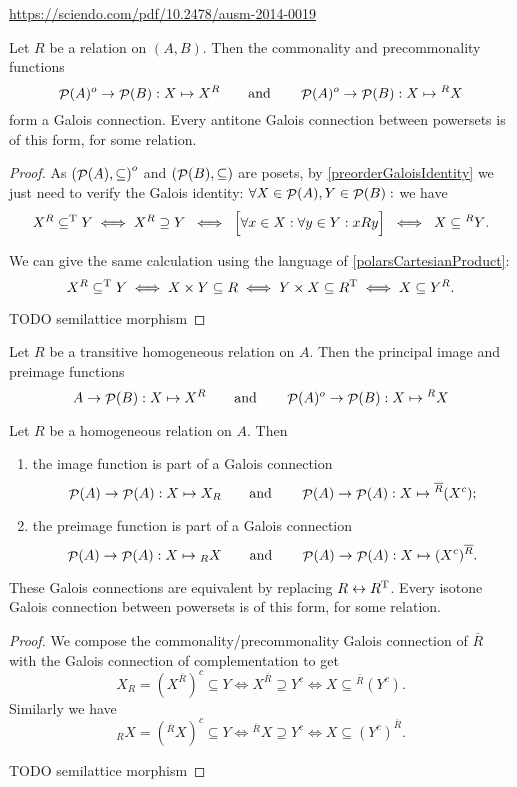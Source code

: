 \url{https://sciendo.com/pdf/10.2478/ausm-2014-0019}

\begin{proposition} \label{polarsGaloisConnection}
Let $R$ be a relation on $(A,B)$. Then the commonality and precommonality functions
\[ \mathop{\mathcal{P}}(A)^o\to\mathop{\mathcal{P}}(B): X\mapsto X^R \qquad\text{and}\qquad \mathop{\mathcal{P}}(A)^o\to\mathop{\mathcal{P}}(B): X\mapsto {^RX} \]
form a Galois connection. Every antitone Galois connection between powersets is of this form, for some relation.
\end{proposition}
\begin{proof}
As $\left( \mathop{\mathcal{P}}(A), \subseteq \right)^o$ and $\left( \mathop{\mathcal{P}}(B), \subseteq \right)$ are posets, by \ref{preorderGaloisIdentity} we just need to verify the Galois identity: $\forall X\in \mathop{\mathcal{P}}(A), Y\in\mathop{\mathcal{P}}(B):$ we have
\[ X^R \subseteq^{\mathrm{T}} Y \iff X^R \supseteq Y \;\iff\; \Big[ \forall x\in X: \forall y\in Y: xRy \Big] \;\iff\; X \subseteq {^RY}. \]

We can give the same calculation using the language of \ref{polarsCartesianProduct}:
\[ X^R \subseteq^{\mathrm{T}} Y \iff X\times Y \subseteq R \iff Y\times X \subseteq R^{\mathrm{T}} \iff X \subseteq Y^R. \]

TODO semilattice morphism
\end{proof}
\begin{corollary}
Let $R$ be a transitive homogeneous relation on $A$. Then the principal image and preimage functions
\[ A \to\mathop{\mathcal{P}}(B): X\mapsto X^R \qquad\text{and}\qquad \mathop{\mathcal{P}}(A)^o\to\mathop{\mathcal{P}}(B): X\mapsto {^RX} \]
\end{corollary}

\begin{proposition} \label{imagePreimageGaloisConnection}
Let $R$ be a homogeneous relation on $A$. Then
\begin{enumerate}
\item the image function is part of a Galois connection
\[ \mathop{\mathcal{P}}(A)\to\mathop{\mathcal{P}}(A): X\mapsto X_R \qquad\text{and}\qquad \mathop{\mathcal{P}}(A)\to\mathop{\mathcal{P}}(A): X\mapsto {^{\overline{R}}(X^c)}; \]
\item the preimage function is part of a Galois connection
\[ \mathop{\mathcal{P}}(A)\to\mathop{\mathcal{P}}(A): X\mapsto {_RX} \qquad\text{and}\qquad \mathop{\mathcal{P}}(A)\to\mathop{\mathcal{P}}(A): X\mapsto (X^c)^{\overline{R}}. \]
\end{enumerate}
These Galois connections are equivalent by replacing $R \leftrightarrow R^{\mathrm{T}}$. Every isotone Galois connection between powersets is of this form, for some relation.
\end{proposition}
\begin{proof}
We compose the commonality/precommonality Galois connection of $\overline{R}$ with the Galois connection of complementation to get
\[ X_R = (X^{\overline{R}})^c \subseteq Y \iff X^{\overline{R}} \supseteq Y^c \iff X \subseteq {^{\overline{R}}(Y^c)}. \]
Similarly we have
\[ {_RX} = ({^{\overline{R}}X})^c \subseteq Y \iff {^{\overline{R}}}X \supseteq Y^c \iff X \subseteq (Y^c)^{\overline{R}}. \]

TODO semilattice morphism
\end{proof}

